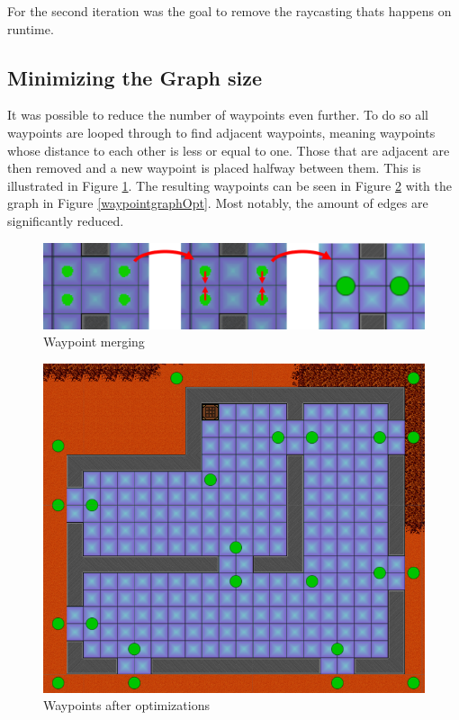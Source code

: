 For the second iteration was the goal to remove the raycasting thats happens on runtime.

\subsection*{Minimizing the Graph size}
It was possible to reduce the number of waypoints even further.
To do so all waypoints are looped through to find adjacent waypoints, meaning waypoints whose distance to each other is less or equal to one.
Those that are adjacent are then removed and a new waypoint is placed halfway between them.
This is illustrated in Figure \ref{waypointMerge}.
The resulting waypoints can be seen in Figure \ref{waypointOpt} with the graph in Figure \ref{waypointgraphOpt}.
Most notably, the amount of edges are significantly reduced.
\begin{figure}[H]
	\includegraphics[width=\textwidth]{figures/astar/waypointMerge}
	\caption{Waypoint merging}
	\label{waypointMerge}
\end{figure}

\begin{figure}[H]
	\includegraphics[width=\textwidth]{figures/astar/optimizedWaypoints}
	\caption{Waypoints after optimizations}
	\label{waypointOpt}
\end{figure}

